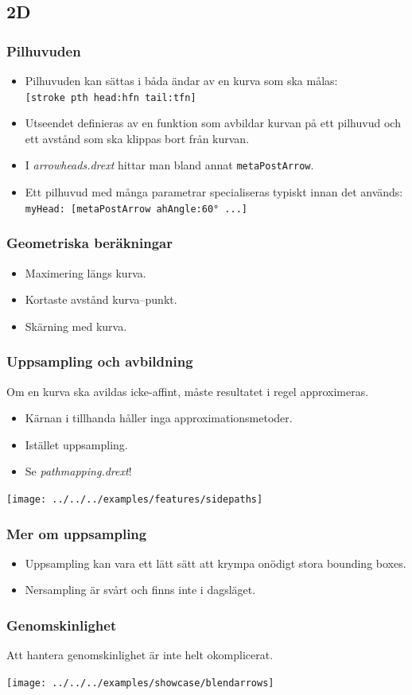\documentclass[noamsthm,handout]{beamer}
\begin{document}
\subsection{2D}
\begin{frame}\frametitle{Pilhuvuden}
  \begin{itemize}
  \item Pilhuvuden kan sättas i båda ändar av en kurva som ska målas:\\
    \texttt{[stroke pth head:hfn tail:tfn]}
  \item Utseendet definieras av en funktion som avbildar kurvan på ett pilhuvud och ett avstånd som ska klippas bort från kurvan.
  \item I \emph{arrowheads.drext} hittar man bland annat \texttt{metaPostArrow}.
  \item Ett pilhuvud med många parametrar specialiseras typiskt innan det används:\\
    \texttt{myHead: [metaPostArrow ahAngle:60° ...]}
  \end{itemize}
\end{frame}
\begin{frame}\frametitle{Geometriska beräkningar}
  \begin{itemize}
  \item Maximering längs kurva.
  \item Kortaste avstånd kurva--punkt.
  \item Skärning med kurva.
  \end{itemize}
\end{frame}
\begin{frame}\frametitle{Uppsampling och avbildning}
  Om en kurva ska avildas icke-affint, måste resultatet i regel approximeras.
  \begin{itemize}
  \item Kärnan i \Shapes tillhanda håller inga approximationsmetoder.
  \item Istället uppsampling.
  \item Se \emph{pathmapping.drext}!
  \end{itemize}
  \begin{center}
    \texttt{[image: ../../../examples/features/sidepaths]}
  \end{center}
\end{frame}
\begin{frame}\frametitle{Mer om uppsampling}
  \begin{itemize}
  \item Uppsampling kan vara ett lätt sätt att krympa onödigt stora bounding boxes.
  \item Nersampling är svårt och finns inte i dagsläget.
  \end{itemize}
\end{frame}
\begin{frame}\frametitle{Genomskinlighet}
  Att hantera genomskinlighet är inte helt okomplicerat.
  \begin{center}
    \texttt{[image: ../../../examples/showcase/blendarrows]}
  \end{center}
\end{frame}
\end{document}
